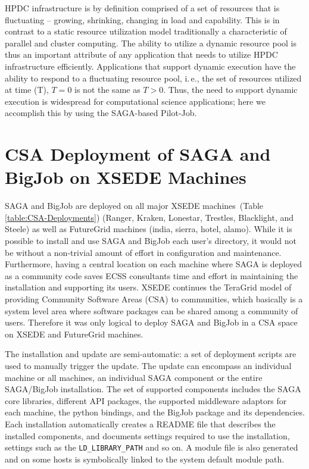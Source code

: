 \documentclass{sig-alternate}
\begin{document}
HPDC infrastructure is by definition comprised of a set of resources
that is fluctuating -- growing, shrinking, changing in load and
capability. This is in contrast to a static resource utilization model
traditionally a characteristic of parallel and cluster computing. The
ability to utilize a dynamic resource pool is thus an important
attribute of any application that needs to utilize HPDC infrastructure
efficiently. Applications that support dynamic execution have the
ability to respond to a fluctuating resource pool, i.\,e., the set of
resources utilized at time (T), $T=0$ is not the same as $T>0$.  Thus,
the need to support dynamic execution is widespread for computational
science applications; here we accomplish this by using the SAGA-based
Pilot-Job.


\section{CSA Deployment of SAGA and BigJob on XSEDE Machines}
 \label{ssec:csa}
 
SAGA and BigJob are deployed on all major XSEDE
machines~(Table \ref{table:CSA-Deployments}) (Ranger,
Kraken, Lonestar, Trestles, Blacklight, and Steele) as well as FutureGrid machines
(india, sierra, hotel, alamo). While it is possible to install and
use SAGA and BigJob each user's directory, it would not be without a non-trivial
amount of effort in configuration and maintenance. Furthermore, having a
central location on each machine where SAGA is deployed as a community code
saves ECSS consultants time and effort in maintaining the installation and
supporting its users. XSEDE continues the TeraGrid model of providing Community
Software Areas (CSA) to communities, which basically is a system
level area where software packages can be shared among a community of users.
Therefore it was only logical to deploy SAGA and BigJob in a CSA space on XSEDE
and FutureGrid machines.

The installation and update are semi-automatic: a set of deployment
scripts are used to manually trigger the update. The update can encompass an
individual machine or all machines, an individual SAGA component or the entire
SAGA/BigJob installation. The set of supported components includes the SAGA core
libraries, different API packages, the supported
middleware adaptors for each machine, the python bindings, and the
BigJob package and its dependencies. Each installation automatically creates a
README file that describes the installed components, and documents settings
required to use the installation, settings such as the
\texttt{LD\_LIBRARY\_PATH} and so on. A module file is also generated and on
some hosts is symbolically linked to the system default module path. 
\end{document}
